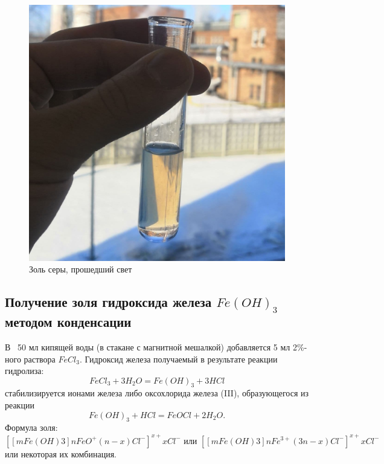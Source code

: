 \documentclass[a4paper, 12pt]{article}
\begin{document}
\begin{figure}[h]
\begin{center}
\begin{minipage}[h]{0.45\linewidth}
\includegraphics[width=1\linewidth]{photo_2021-03-11_16-33-01.jpg}
\caption{Золь серы, прошедший свет}
\label{ris:experimcoded}
\end{minipage}
\end{center}
\end{figure}

\subsection{Получение золя гидроксида железа $Fe(OH)_{3}$ методом конденсации}
В ~50 мл кипящей воды (в стакане с магнитной мешалкой) добавляется 5 мл 2\%-ного раствора $FeCl_{3}$. 
Гидроксид железа получаемый в результате реакции гидролиза:
$$FeCl_{3} + 3 H_{2}O = Fe(OH)_{3} + 3 HCl$$
стабилизируется ионами железа либо оксохлорида железа (III), образующегося из реакции
$$Fe(OH)_{3} + HCl = FeOCl + 2 H_{2}O.$$
Формула золя:
$$[ [m Fe(OH)3 ] nFeO^{+}(n - x)Cl^{-}]^{x+} xCl^{-} \text{ или } [[m Fe(OH)3 ] nFe^{3+}(3n - x)Cl^{-}]^{x+} xCl^{-}$$
или некоторая их комбинация.
\end{document}
